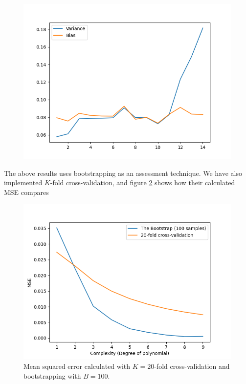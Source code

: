 \documentclass[../main.tex]{subfiles}
\begin{document}
\begin{figure}[h]
    \centering
    \includegraphics[width=\textwidth]{../assets/var.png}
    \label{fig:result_bias_variance}
\end{figure}

The above results uses bootstrapping as an assessment technique. We have also implemented $K$-fold cross-validation, and figure \ref{fig:result_cv_boot_mse} shows how their calculated MSE compares

\begin{figure}[h]
    \centering
    \includegraphics[width=\textwidth]{../assets/cv_boot_mse.png}
    \caption{Mean squared error calculated with $K=20$-fold cross-validation and bootstrapping with $B=100$.}
    \label{fig:result_cv_boot_mse}
\end{figure}
\end{document}

